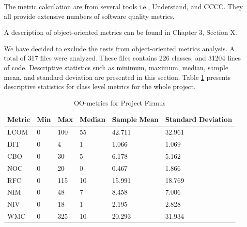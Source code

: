 The metric calculation are from several tools i.e., Understand, and CCCC. They all provide extensive numbers of software quality metrics.


A description of object-oriented metrics can be found in Chapter 3, Section X. 

We have decided to exclude the tests from object-oriented metrics analysis. A total of 317 files were analyzed. These files contains 226 classes, and 31204 lines of code. Descriptive statistics such as minimum, maximum, median, sample mean, and standard deviation are presented in this section. Table \ref{tab:oometrics-firmus} presents descriptive statistics for class level metrics for the whole project.

\begin{table}[]
\centering
\caption{OO-metrics for Project Firmus}
\label{tab:oometrics-firmus}
\begin{tabular}{|l|l|l|l|l|l|}
\hline
\textbf{Metric} & \textbf{Min} & \textbf{Max} & \textbf{Median} & \textbf{Sample Mean} & \textbf{Standard Deviation} \\ \hline
LCOM            & 0            & 100          & 55              & 42.711               & 32.961                      \\ \hline
DIT             & 0            & 4            & 1               & 1.066                & 1.069                       \\ \hline
CBO             & 0            & 30           & 5               & 6.178                & 5.162                       \\ \hline
NOC             & 0            & 20           & 0               & 0.467                & 1.866                       \\ \hline
RFC             & 0            & 115          & 10              & 15.991               & 18.769                      \\ \hline
NIM             & 0            & 48           & 7               & 8.458                & 7.006                       \\ \hline
NIV             & 0            & 18           & 1               & 2.195                & 2.828                       \\ \hline
WMC            & 0            & 325          & 10              & 20.293                 & 31.934                      \\ \hline
\end{tabular}
\end{table}

